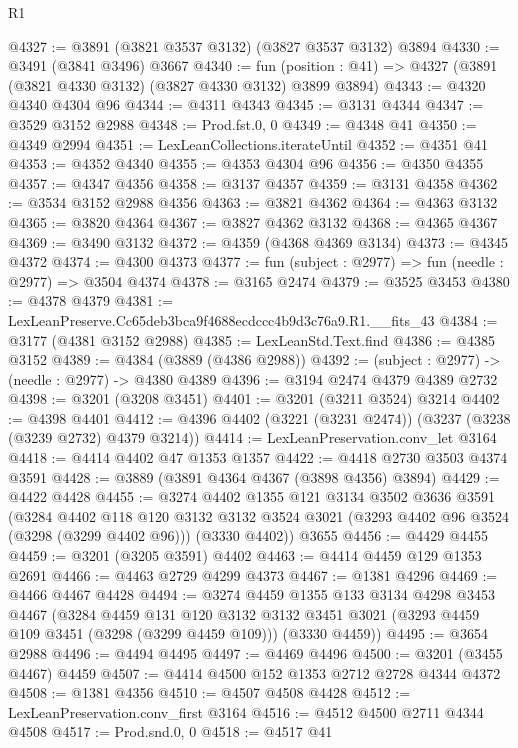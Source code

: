 \begin{lexlean}{R1}
\begin{coremodule}
@4327 := @3891 (@3821 @3537 @3132) (@3827 @3537 @3132) @3894
@4330 := @3491 (@3841 @3496) @3667
@4340 := fun (position : @41) => @4327 (@3891 (@3821 @4330 @3132) (@3827 @4330 @3132) @3899 @3894)
@4343 := @4320 @4340 @4304 @96
@4344 := @4311 @4343
@4345 := @3131 @4344
@4347 := @3529 @3152 @2988
@4348 := Prod.fst.{0, 0}
@4349 := @4348 @41
@4350 := @4349 @2994
@4351 := LexLeanCollections.iterateUntil
@4352 := @4351 @41
@4353 := @4352 @4340
@4355 := @4353 @4304 @96
@4356 := @4350 @4355
@4357 := @4347 @4356
@4358 := @3137 @4357
@4359 := @3131 @4358
@4362 := @3534 @3152 @2988 @4356
@4363 := @3821 @4362
@4364 := @4363 @3132
@4365 := @3820 @4364
@4367 := @3827 @4362 @3132
@4368 := @4365 @4367
@4369 := @3490 @3132
@4372 := @4359 (@4368 @4369 @3134)
@4373 := @4345 @4372
@4374 := @4300 @4373
@4377 := fun (subject : @2977) => fun (needle : @2977) => @3504 @4374
@4378 := @3165 @2474
@4379 := @3525 @3453
@4380 := @4378 @4379
@4381 := LexLeanPreserve.Cc65deb3bca9f4688ecdccc4b9d3c76a9.R1.__fits_43
@4384 := @3177 (@4381 @3152 @2988)
@4385 := LexLeanStd.Text.find
@4386 := @4385 @3152
@4389 := @4384 (@3889 (@4386 @2988))
@4392 := (subject : @2977) -> (needle : @2977) -> @4380 @4389
@4396 := @3194 @2474 @4379 @4389 @2732
@4398 := @3201 (@3208 @3451)
@4401 := @3201 (@3211 @3524) @3214
@4402 := @4398 @4401
@4412 := @4396 @4402 (@3221 (@3231 @2474)) (@3237 (@3238 (@3239 @2732) @4379 @3214))
@4414 := LexLeanPreservation.conv_let @3164
@4418 := @4414 @4402 @47 @1353 @1357
@4422 := @4418 @2730 @3503 @4374 @3591
@4428 := @3889 (@3891 @4364 @4367 (@3898 @4356) @3894)
@4429 := @4422 @4428
@4455 := @3274
    @4402
    @1355
    @121
    @3134
    @3502
    @3636
    @3591
    (@3284
      @4402
      @118
      @120
      @3132
      @3132
      @3524
      @3021
      (@3293 @4402 @96 @3524 (@3298 (@3299 @4402 @96)))
      (@3330 @4402))
    @3655
@4456 := @4429 @4455
@4459 := @3201 (@3205 @3591) @4402
@4463 := @4414 @4459 @129 @1353 @2691
@4466 := @4463 @2729 @4299 @4373
@4467 := @1381 @4296
@4469 := @4466 @4467 @4428
@4494 := @3274
    @4459
    @1355
    @133
    @3134
    @4298
    @3453
    @4467
    (@3284
      @4459
      @131
      @120
      @3132
      @3132
      @3451
      @3021
      (@3293 @4459 @109 @3451 (@3298 (@3299 @4459 @109)))
      (@3330 @4459))
@4495 := @3654 @2988
@4496 := @4494 @4495
@4497 := @4469 @4496
@4500 := @3201 (@3455 @4467) @4459
@4507 := @4414 @4500 @152 @1353 @2712 @2728 @4344 @4372
@4508 := @1381 @4356
@4510 := @4507 @4508 @4428
@4512 := LexLeanPreservation.conv_first @3164
@4516 := @4512 @4500 @2711 @4344 @4508
@4517 := Prod.snd.{0, 0}
@4518 := @4517 @41

\end{coremodule}
\end{lexlean}
